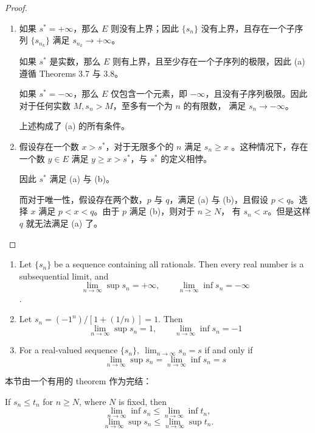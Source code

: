 \documentclass[../poma-notes.tex]{subfiles}
\begin{document}
\begin{proof}
  \begin{enumerate}[label=(\alph*)]
    \item 如果 $s^* = + \infty$，那么 $E$ 则没有上界；因此 $\{s_n\}$ 没有上界，且存在一个子序列 $\{s_{n_k}\}$ 满足 $s_{n_k} \to + \infty$。

          如果 $s^*$ 是实数，那么 $E$ 则有上界，且至少存在一个子序列的极限，因此 (a) 遵循 Theorems 3.7 与 3.8。

          如果 $s^* = - \infty$，那么 $E$ 仅包含一个元素，即 $- \infty$，且没有子序列极限。因此对于任何实数 $M, s_n > M$，至多有一个为 $n$ 的有限数，
          满足 $s_n \to - \infty$。

          上述构成了 (a) 的所有条件。
    \item 假设存在一个数 $x > s^*$，对于无限多个的 $n$ 满足 $s_n \ge x$ 。这种情况下，存在一个数 $y \in E$ 满足 $y \ge x > s^*$，与 $s^*$ 的定义相悖。

          因此 $s^*$ 满足 (a) 与 (b)。

          而对于唯一性，假设存在两个数，$p$ 与 $q$，满足 (a) 与 (b)，且假设 $p < q$。选择 $x$ 满足 $p < x < q$。由于 $p$ 满足 (b)，则对于 $n \ge N$，
          有 $s_n < x$。但是这样 $q$ 就无法满足 (a) 了。
  \end{enumerate}
\end{proof}

\begin{examples}\mbox{}
  \begin{enumerate}[label=(\alph*)]
    \item Let $\{s_n\}$ be a sequence containing all rationals. Then every real number is a subsequential limit, and
          \[ \lim_{n \to \infty} \sup s_n = + \infty, \qquad \lim_{n \to \infty} \inf s_n = - \infty \].
    \item Let $s_n = (-1^n)/[1+(1/n)] = 1$. Then
          \[ \lim_{n \to \infty} \sup s_n = 1, \qquad \lim_{n \to \infty} \inf s_n = -1 \]
    \item For a real-valued sequence $\{s_n\},\ \lim_{n \to \infty} s_n = s$ if and only if
          \[ \lim_{n \to \infty} \sup s_n = \lim_{n \to \infty} \inf s_n = s \]
  \end{enumerate}
\end{examples}

本节由一个有用的 theorem 作为完结：

\begin{theorem}
  If $s_n \le t_n$ for $n \ge N$, where $N$ is fixed, then
  \[ \lim_{n \to \infty} \inf s_n \le \lim_{n \to \infty} \inf t_n, \]
  \[ \lim_{n \to \infty} \sup s_n \le \lim_{n \to \infty} \sup t_n. \]
\end{theorem}
\end{document}
